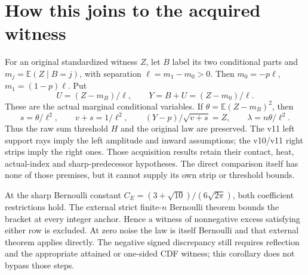 \documentclass[11pt]{article}
\newcommand{\E}{\mathbb E}\newcommand{\Pp}{\mathbb P}
\begin{document}
\section*{How this joins to the acquired witness}
For an original standardized witness $Z$, let $B$ label its two conditional
parts and $m_j=\E(Z\mid B=j)$, with separation $\ell=m_1-m_0>0$.
Then $m_0=-p\ell$, $m_1=(1-p)\ell$. Put
\[
 U=(Z-m_B)/\ell,\qquad Y=B+U=(Z-m_0)/\ell.
\]
These are the actual marginal conditional variables. If
$\theta=\E(Z-m_B)^2$, then
\[
 s=\theta/\ell^2,\qquad v+s=1/\ell^2,\qquad
 (Y-p)/\sqrt{v+s}=Z,\qquad\lambda=n\theta/\ell^2.
\]
Thus the raw sum threshold $H$ and the original law are preserved.
The v11 left support rays imply the left amplitude and inward assumptions;
the v10/v11 right strips imply the right ones. Those acquisition results
retain their contact, heat, actual-index and sharp-predecessor hypotheses.
The direct comparison itself has none of those premises, but it cannot
supply its own strip or threshold bounds.

At the sharp Bernoulli constant
$C_E=(3+\sqrt{10})/(6\sqrt{2\pi})$, both coefficient restrictions hold.
The external strict finite-$n$ Bernoulli theorem bounds the bracket at
every integer anchor. Hence a witness of nonnegative excess satisfying
either row is excluded. At zero noise the law is itself Bernoulli and that
external theorem applies directly. The negative signed discrepancy still
requires reflection and the appropriate attained or one-sided CDF witness;
this corollary does not bypass those steps.
\end{document}
